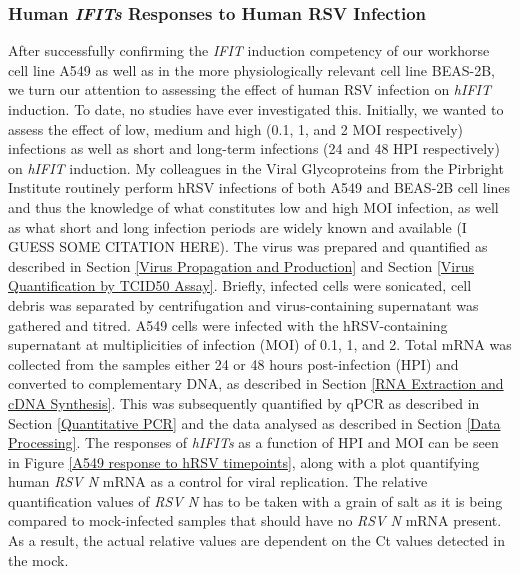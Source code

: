 \subsubsection{Human \textit{IFITs} Responses to Human RSV Infection} \label{Human \textit{IFITs} Responses to Human RSV}
After successfully confirming the \textit{IFIT} induction competency of  our workhorse cell line A549 as well as in the more physiologically relevant cell line BEAS-2B, we turn our attention to assessing the effect of human RSV infection on \textit{hIFIT} induction. To date, no studies have ever investigated this. Initially, we wanted to assess the effect of low, medium and high (0.1, 1, and 2 MOI respectively) infections as well as short and long-term infections (24 and 48 HPI respectively) on \textit{hIFIT} induction. My colleagues in the Viral Glycoproteins from the Pirbright Institute routinely perform hRSV infections of both A549 and BEAS-2B cell lines and thus the knowledge of what constitutes low and high MOI infection, as well as what short and long infection periods are widely known and available (I GUESS SOME CITATION HERE).  The virus was prepared and quantified as described in Section \ref{Virus Propagation and Production} and Section \ref{Virus Quantification by TCID50 Assay}. Briefly, infected cells were sonicated, cell debris was separated by centrifugation and virus-containing supernatant was gathered and titred. A549 cells were infected with the hRSV-containing supernatant at multiplicities of infection (MOI) of 0.1, 1,  and 2. Total mRNA was collected from the samples either 24 or 48 hours post-infection (HPI) and converted to complementary DNA, as described in Section \ref{RNA Extraction and cDNA Synthesis}. This was subsequently quantified by qPCR as described in Section \ref{Quantitative PCR} and the data analysed as described in Section \ref{Data Processing}. The responses of \textit{hIFITs} as a function of HPI and MOI can be seen in Figure \ref{A549 response to hRSV timepoints}, along with a plot quantifying human \textit{RSV N} mRNA as a control for viral replication. The relative quantification values of \textit{RSV N} has to be taken with a grain of salt as it is being compared to mock-infected samples that should have no \textit{RSV N} mRNA present. As a result, the actual relative values are dependent on the Ct values detected in the mock. 
 

